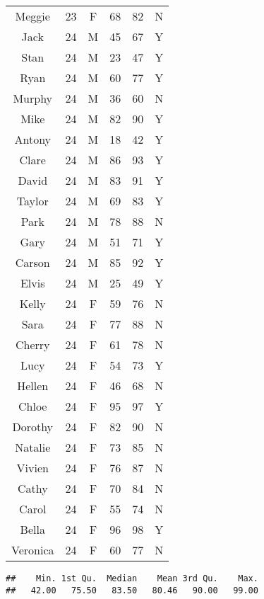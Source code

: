 \documentclass{article}\usepackage[]{graphicx}\usepackage[]{color}
\makeatletter
\newenvironment{kframe}{%
 \def\at@end@of@kframe{}%
 \ifinner\ifhmode%
  \def\at@end@of@kframe{\end{minipage}}%
  \begin{minipage}{\columnwidth}%
 \fi\fi%
 \def\FrameCommand##1{\hskip\@totalleftmargin \hskip-\fboxsep
 \colorbox{shadecolor}{##1}\hskip-\fboxsep
     \hskip-\linewidth \hskip-\@totalleftmargin \hskip\columnwidth}%
 \MakeFramed {\advance\hsize-\width
   \@totalleftmargin\z@ \linewidth\hsize
   \@setminipage}}%
 {\par\unskip\endMakeFramed%
 \at@end@of@kframe}
\newenvironment{knitrout}{}{} %
\makeatother
\begin{document}
\begin{knitrout}
\begin{table}[!h]
\begin{tabular}[t]{cccccc}
Meggie & 23 & F & 68 & 82 & N\\
Jack & 24 & M & 45 & 67 & Y\\
Stan & 24 & M & 23 & 47 & Y\\
Ryan & 24 & M & 60 & 77 & Y\\
Murphy & 24 & M & 36 & 60 & N\\
\addlinespace
Mike & 24 & M & 82 & 90 & Y\\
Antony & 24 & M & 18 & 42 & Y\\
Clare & 24 & M & 86 & 93 & Y\\
David & 24 & M & 83 & 91 & Y\\
Taylor & 24 & M & 69 & 83 & Y\\
\addlinespace
Park & 24 & M & 78 & 88 & N\\
Gary & 24 & M & 51 & 71 & Y\\
Carson & 24 & M & 85 & 92 & Y\\
Elvis & 24 & M & 25 & 49 & Y\\
Kelly & 24 & F & 59 & 76 & N\\
\addlinespace
Sara & 24 & F & 77 & 88 & N\\
Cherry & 24 & F & 61 & 78 & N\\
Lucy & 24 & F & 54 & 73 & Y\\
Hellen & 24 & F & 46 & 68 & N\\
Chloe & 24 & F & 95 & 97 & Y\\
\addlinespace
Dorothy & 24 & F & 82 & 90 & N\\
Natalie & 24 & F & 73 & 85 & N\\
Vivien & 24 & F & 76 & 87 & N\\
Cathy & 24 & F & 70 & 84 & N\\
Carol & 24 & F & 55 & 74 & N\\
\addlinespace
Bella & 24 & F & 96 & 98 & Y\\
Veronica & 24 & F & 60 & 77 & N\\
\bottomrule
\end{tabular}
\end{table}


\end{knitrout}

\begin{knitrout}
\color{fgcolor}\begin{kframe}
\begin{verbatim}
##    Min. 1st Qu.  Median    Mean 3rd Qu.    Max. 
##   42.00   75.50   83.50   80.46   90.00   99.00
\end{verbatim}
\end{kframe}
\end{knitrout}
\end{document}
